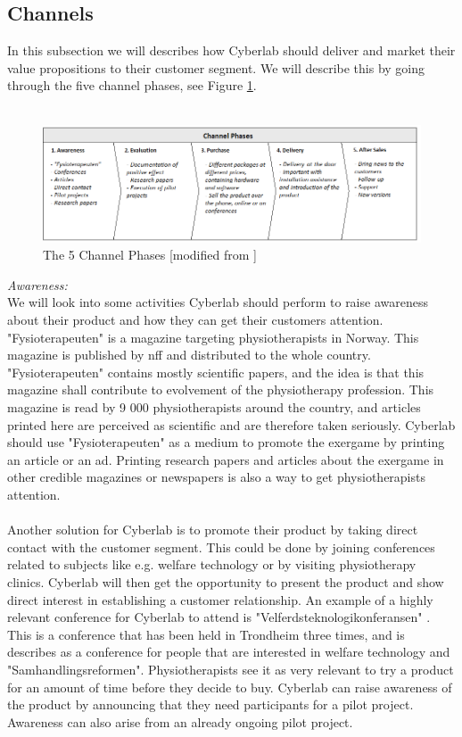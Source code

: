 \subsection{Channels}
In this subsection we will describes how Cyberlab should deliver and market their value propositions to their customer segment. We will describe this by going through the five channel phases, see Figure \ref{fig:Channels}.\\ \\
\begin{figure}
\begin{center}
\includegraphics[angle=90,scale=0.7]{channels}
\caption[Channels]{The 5 Channel Phases [modified from \cite{osterwalder}\cite{osterwalderthesis}]}
\label{fig:Channels}
\end{center}
\end{figure}
\emph{Awareness:} \\ 
We will look into some activities Cyberlab should perform to raise awareness about their product and how they can get their customers attention. "Fysioterapeuten" is a magazine targeting physiotherapists in Norway. This magazine is published by \ac{nff} and distributed to the whole country. "Fysioterapeuten" contains mostly scientific papers, and the idea is that this magazine shall contribute to evolvement of the physiotherapy profession. This magazine is read by 9 000 physiotherapists around the country, and articles printed here are perceived as scientific and are therefore taken seriously. Cyberlab should use "Fysioterapeuten" as a medium to promote the exergame by printing an article or an ad. Printing research papers and articles about the exergame in other credible magazines or newspapers is also a way to get physiotherapists attention. \\ \\
Another solution for Cyberlab is to promote their product by taking direct contact with the customer segment. This could be done by joining conferences related to subjects like e.g. welfare technology or by visiting physiotherapy clinics. Cyberlab will then get the opportunity to present the product and show direct interest in establishing a customer relationship. An example of a highly relevant conference for Cyberlab to attend is "Velferdsteknologikonferansen" \cite{conference}. This is a conference that has been held in Trondheim three times, and is describes as a conference for people that are interested in welfare technology and "Samhandlingsreformen". Physiotherapists see it as very relevant to try a product for an amount of time before they decide to buy. Cyberlab can raise awareness of the product by announcing that they need participants for a pilot project. Awareness can also arise from an already ongoing pilot project. \\ \\
